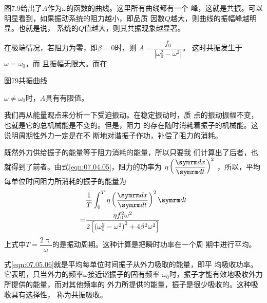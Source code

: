 图7.9给出了$ A $作为$ \omega $的函数的曲线。这里所有曲线都有一个
峰，这就是共振。可以明显看到，如果振动系统的阻力越小，即品质
因数$ Q $越大，则曲线的振幅峰越明显。也就是说，
系统的$ Q $值越大，则其共振现象越显著。

在极端情况，若阻力为零，即$ \beta = 0 $时，则
$ A = \dfrac { f _ { 0 } } { \left| \omega_{ 0 } ^ { 2 } - \omega ^ { 2 } \right| } $。
这时共振发生于$ \omega = \omega _ { 0 } $，而
且振幅无限大。而在

图79共振曲线

$ \omega \ne \omega _ { 0 } $时，$ A $具有有限值。

我们再从能量观点来分析一下受迫振动。在稳定振动时，质
点的振动振幅不变，也就是它的总机械能是不变的。但是，阻力
的存在随时消耗着振子的机械能。这说明周期性外力一定是在不
断地对谐振子作功，补偿了阻力的消耗。

既然外力供给振子的能量等于阻力消耗的能量，所以只要我
们计算出了后者，也就得到了前者。由式\eqref{eqn:07.04.05}，阻力的功率为
$ \eta \left( \dfrac { \dif x } { \dif t } \right) ^ { 2 } $
，所以，平均每单位时间阻力所消耗的振子的能量为
\begin{equation}\label{eqn:07.05.06}
    \begin{aligned}
        &\frac { 1 } { T } \int _ { 0 } ^ { T } \eta  \left( \frac { \dif x } { \dif t } \right) ^ { 2 } \dif t \\
     = &\frac { \eta f _ { 0 } ^ { 2 } \omega ^ { 2 } } { 2 \left[ \left( \omega_{ 0 } ^ { 2 } - \omega ^ { 2 } \right) ^ { 2 } + 4 \beta ^ { 2 } \omega ^ { 2 } \right] }
    \end{aligned}
\end{equation}
上式中$ T = \dfrac { 2 \uppi } { \omega } $的是振动周期。这种计算是把瞬时功率在一个周
期中进行平均。

式\eqref{eqn:07.05.06}就是平均每单位时间振子从外力吸取的能量，即平
均吸收功率。它表明，只当外力的频率$ \omega $接近谐振子的固有频率
$ \omega_{ 0 } $时，振子才能有效地吸收外力所提供的能量，而对其他频率的
外力所提供的能量，振子是很少吸收的。这种吸收具有选择性，
称为共振吸收。

